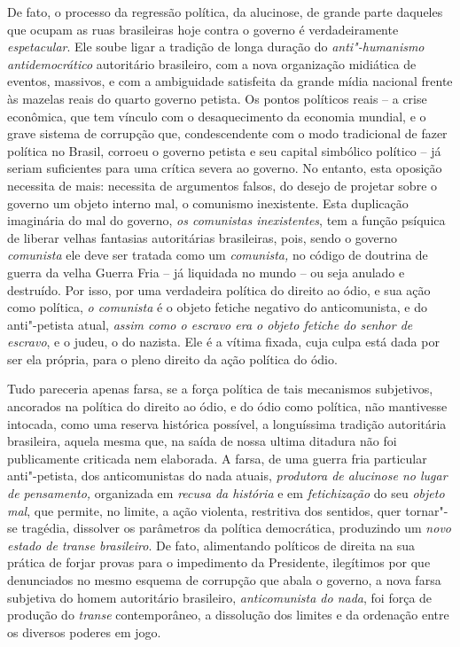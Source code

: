 De fato, o processo da regressão política, da alucinose, de grande parte
daqueles que ocupam as ruas brasileiras hoje contra o governo é
verdadeiramente \emph{espetacular}. Ele soube ligar a tradição de longa
duração do \emph{anti"-humanismo antidemocrático} autoritário brasileiro,
com a nova organização midiática de eventos, massivos, e com a
ambiguidade satisfeita da grande mídia nacional frente às mazelas reais
do quarto governo petista. Os pontos políticos reais -- a crise
econômica, que tem vínculo com o desaquecimento da economia mundial, e o
grave sistema de corrupção que, condescendente com o modo tradicional de
fazer política no Brasil, corroeu o governo petista e seu capital
simbólico político -- já seriam suficientes para uma crítica severa ao
governo. No entanto, esta oposição necessita de mais: necessita de
argumentos falsos, do desejo de projetar sobre o governo um objeto
interno mal, o comunismo inexistente. Esta duplicação imaginária do mal
do governo, \emph{os comunistas inexistentes}, tem a função psíquica de
liberar velhas fantasias autoritárias brasileiras, pois, sendo o governo
\emph{comunista} ele deve ser tratada como um \emph{comunista,} no
código de doutrina de guerra da velha Guerra Fria -- já liquidada no
mundo -- ou seja anulado e destruído. Por isso, por uma verdadeira
política do direito ao ódio, e sua ação como política, \emph{o
comunista} é o objeto fetiche negativo do anticomunista, e do
anti"-petista atual, \emph{assim como o escravo era o objeto fetiche do
senhor de escravo}, e o judeu, o do nazista. Ele é a vítima fixada, cuja
culpa está dada por ser ela própria, para o pleno direito da ação
política do ódio.

Tudo pareceria apenas farsa, se a força política de tais mecanismos
subjetivos, ancorados na política do direito ao ódio, e do ódio como
política, não mantivesse intocada, como uma reserva histórica possível,
a longuíssima tradição autoritária brasileira, aquela mesma que, na
saída de nossa ultima ditadura não foi publicamente criticada nem
elaborada. A farsa, de uma guerra fria particular anti"-petista, dos
anticomunistas do nada atuais, \emph{produtora de alucinose no lugar de
pensamento,} organizada em \emph{recusa da história} e em
\emph{fetichização} do seu \emph{objeto mal}, que permite, no limite, a
ação violenta, restritiva dos sentidos, quer tornar"-se tragédia,
dissolver os parâmetros da política democrática, produzindo um
\emph{novo estado de transe brasileiro}. De fato, alimentando políticos
de direita na sua prática de forjar provas para o impedimento da
Presidente, ilegítimos por que denunciados no mesmo esquema de corrupção
que abala o governo, a nova farsa subjetiva do homem autoritário
brasileiro, \emph{anticomunista do nada}, foi força de produção do
\emph{transe} contemporâneo, a dissolução dos limites e da ordenação
entre os diversos poderes em jogo.

